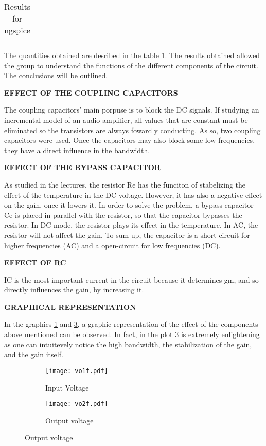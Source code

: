 \begin{enumerate}
\begin{table}[ht]
  \centering
  \begin{tabular}{|l|r|}
    \hline    
   
    \end{tabular}
  \caption{Results for ngspice}
    \label{tab:results}
\end{table}


The quantities obtained are desribed in the table \ref{tab:results}. The results obtained allowed the group to understand the functions of the different components of the circuit. 
The conclusions will be outlined.


 \textbf{EFFECT OF THE COUPLING CAPACITORS}

The coupling capacitors' main porpuse is to block the DC signals. If studying an incremental model of an audio amplifier, all values that are constant must be eliminated so the transistors are always fowardly conducting. As so, two coupling capacitors were used. Once the capacitors may also block some low frequencies, they have a direct influence in the bandwidth.



 \textbf{EFFECT OF THE BYPASS CAPACITOR}
 
  As studied in the lectures, the resistor Re has the funciton of stabelizing the effect of the temperature in the DC voltage. However, it has also a negative effect on the gain, once it lowers it. In order to solve the problem, a bypass capacitor Ce is placed in parallel with the resistor, so that the capacitor bypasses the resistor. In DC mode, the resistor plays its effect in the temperature. In AC, the resistor will not affect the gain. To sum up, the capacitor is a short-circuit for higher frequencies (AC) and a open-circuit for low frequencies (DC).
\newpage

 \textbf{EFFECT OF RC}
 
IC is the most important current in the circuit because it determines gm, and so directly influences the gain, by increasing it.

\textbf{GRAPHICAL REPRESENTATION}

In the graphics \ref{fig:sim4} and \ref{fig:sim5}, a graphic representation of the effect of the components above mentioned can be observed. In fact, in the plot \ref{fig:sim5} is extremely enlightening as one can intuitevely notice the high bandwidth, the stabilization of the gain, and the gain itself.




\begin{figure}[ht]
\centering
\begin{subfigure}{.5\textwidth}
  \centering
  \texttt{[image: vo1f.pdf]}
  \caption{Input Voltage}
  \label{fig:sim4}
\end{subfigure}%
\begin{subfigure}{.5\textwidth}
  \centering
  \texttt{[image: vo2f.pdf]}
  \caption{Output voltage}
  \label{fig:sim5}
\end{subfigure}
\end{figure}





\end{enumerate}
